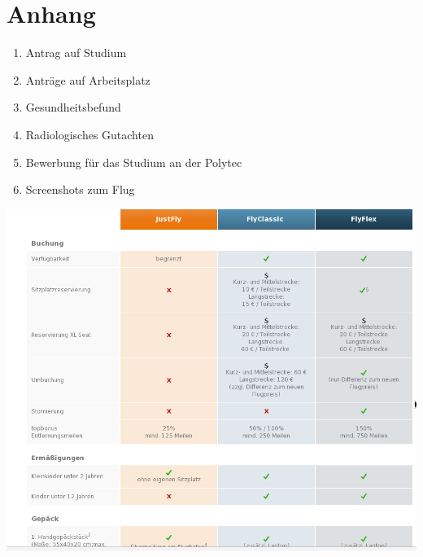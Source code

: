 \documentclass[11pt]{article}
\begin{document}
\section{Anhang}
\begin{enumerate}
\item Antrag auf Studium
\item Anträge auf Arbeitsplatz
\item Gesundheitsbefund
\item Radiologisches Gutachten
\item Bewerbung für das Studium an der Polytec
\item Screenshots zum Flug
\end{enumerate}















\includegraphics[scale=0.45]{Flug_Air_Berlin/Bildschirmfoto_am_2012-06-13_14_47_20.png} 
\end{document}
